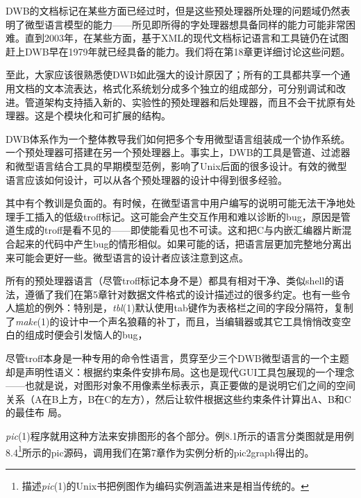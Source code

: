 \documentclass[12pt,oneside]{book}
\begin{document}
DWB的文档标记在某些方面已经过时，但是这些预处理器所处理的问题域仍然表明了微型语言模型的能力——所见即所得的字处理器想具备同样的能力可能非常困难。直到2003年，在某些方面，基于XML的现代文档标记语言和工具链仍在试图赶上DWB早在1979年就已经具备的能力。我们将在第18章更详细讨论这些问题。

至此，大家应该很熟悉使DWB如此强大的设计原因了；所有的工具都共享一个通用文档的文本流表达，格式化系统划分成多个独立的组成部分，可分别调试和改进。管道架构支持插入新的、实验性的预处理器和后处理器，而且不会干扰原有处理器。这是个模块化和可扩展的结构。

DWB体系作为一个整体教导我们如何把多个专用微型语言组装成一个协作系统。一个预处理器可搭建在另一个预处理器上。事实上，DWB的工具是管道、过滤器和微型语言结合工具的早期模型范例，影响了Unix后面的很多设计。有效的微型语言应该如何设计，可以从各个预处理器的设计中得到很多经验。

其中有个教训是负面的。有时候，在微型语言中用户编写的说明可能无法干净地处理手工插入的低级troff标记。这可能会产生交互作用和难以诊断的bug，原因是管道生成的troff是看不见的——即使能看见也不可读。这和把C与内嵌汇编器片断混合起来的代码中产生bug的情形相似。如果可能的话，把语言层更加完整地分离出来可能会更好一些。微型语言的设计者应该注意到这点。

所有的预处理器语言（尽管troff标记本身不是）都具有相对干净、类似shell的语法，遵循了我们在第5章针对数据文件格式的设计描述过的很多约定。也有一些令人尴尬的例外：特别是，\textit{tbl}(1)默认使用tab键作为表格栏之间的字段分隔符，复制了\textit{make}(1)的设计中一个声名狼藉的补丁，而且，当编辑器或其它工具悄悄改变空白的组成时便会引发恼人的bug，

尽管troff本身是一种专用的命令性语言，贯穿至少三个DWB微型语言的一个主题却是声明性语义：根据约束条件安排布局。这也是现代GUI工具包展现的一个理念——也就是说，对图形对象不用像素坐标表示，真正要做的是说明它们之间的空间关系（A在B上方，B在C的左方），然后让软件根据这些约束条件计算出A、B和C的最佳布
局。

\textit{pic}(1)程序就用这种方法来安排图形的各个部分。例8.1所示的语言分类图就是用例8.4\footnote{描述\textit{pic}(1)的Unix书把例图作为编码实例涵盖进来是相当传统的。}所示的pic源码，调用我们在第7章作为实例分析的pic2graph得出的。
\end{document}
